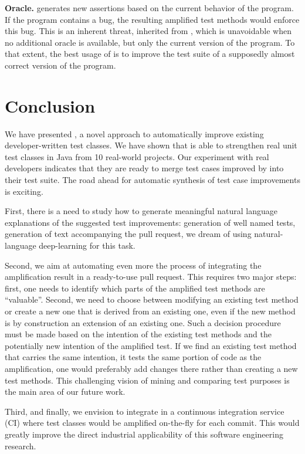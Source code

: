 \textbf{Oracle.}
\dspot generates new assertions based on the current behavior of the program. If the program contains a bug, the resulting amplified test methods would enforce this bug. This is an inherent threat, inherited from \cite{Xie2006}, which is unavoidable when no additional oracle is available, but only the current version of the program. 
To that extent, the best usage of \dspot is to improve the test suite of a supposedly almost correct version of the program.

\section{Conclusion}
\label{sec:conclusion}

We have presented \dspot, a novel approach to automatically improve existing developer-written test classes.
We have shown that \dspot is able to strengthen real unit test classes in Java from 10 real-world projects. 
Our experiment with real developers indicates that they are ready to merge test cases improved by \dspot into their test suite. 
The road ahead for automatic synthesis of test case improvements is exciting.

First, there is a need to study how to generate meaningful natural language explanations of the suggested test improvements: generation of well named tests, generation of text accompanying the pull request, we dream of using natural-language deep-learning for this task.

Second, we aim at automating even more the process of integrating the amplification result in a ready-to-use pull request. This requires two major steps: first, one needs to identify which parts of the amplified test methods are ``valuable''. 
Second, we need to choose between modifying an existing test method or create a new one that is derived from an existing one, even if the new method is by construction an extension of an existing one. 
Such a decision procedure must be made based on the intention of the existing test methods and the potentially new intention of the amplified test. If we find an existing test method that carries the same intention, \ie it tests the same portion of code as the amplification, one would preferably add changes there rather than creating a new test methods. This challenging vision of mining and comparing test purposes is the main area of our future work.

Third, and finally, we envision to integrate \dspot in a continuous integration service (CI) where test classes would be amplified on-the-fly for each commit. This would greatly improve the direct industrial applicability of this software engineering research.